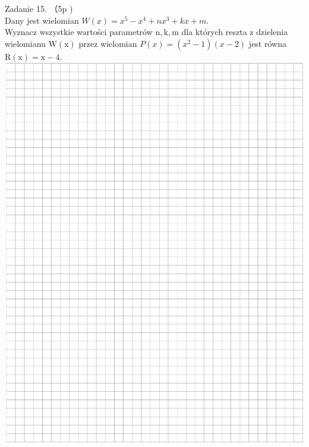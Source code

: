 \documentclass[10pt]{article}
\begin{document}
Zadanie 15. （5p )\\
Dany jest wielomian \(W(x)=x^{5}-x^{4}+n x^{3}+k x+m\).\\
Wyznacz wszystkie wartości parametrów \(\mathrm{n}, \mathrm{k}, \mathrm{m}\) dla których reszta z dzielenia wielomianu \(\mathrm{W}(\mathrm{x})\) przez wielomian \(P(x)=\left(x^{2}-1\right)(x-2)\) jest równa \(\mathrm{R}(\mathrm{x})=\mathrm{x}-4\).\\
\includegraphics[max width=\textwidth, center]{2024_11_21_12a27a32a51fef2c834ag-12}
\end{document}
